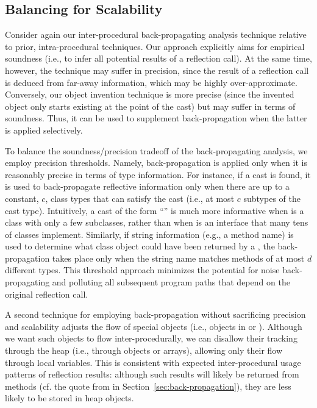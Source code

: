 \subsection{Balancing for Scalability}
\label{sec:throttling}

Consider again our inter-procedural back-propagating analysis
technique relative to prior, intra-procedural techniques. Our approach
explicitly aims for empirical soundness (i.e., to infer all potential
results of a reflection call). At the same time, however, the
technique may suffer in precision, since the result of a reflection
call is deduced from far-away information, which may be highly
over-approximate. Conversely, our object invention technique is more
precise (since the invented object only starts existing at the point
of the cast) but may suffer in terms of soundness. Thus, it can be
used to supplement back-propagation when the latter is applied
selectively.

To balance the soundness/precision tradeoff of the back-propagating
analysis, we employ precision thresholds. Namely, back-propagation is
applied only when it is reasonably precise in terms of type
information. For instance, if a cast is found, it is used to
back-propagate reflective information only when there are up to a
constant, $c$, class types that can satisfy the cast (i.e., at most
$c$ subtypes of the cast type). Intuitively, a cast of the form
``'' is much more informative when  is a
class with only a few subclasses, rather than when  is an
interface that many tens of classes implement. Similarly, if string
information (e.g., a method name) is used to determine what class
object could have been returned by a ,
the back-propagation takes place only when the string name matches
methods of at most $d$ different types. This threshold approach
minimizes the potential for noise back-propagating and polluting all
subsequent program paths that depend on the original reflection call.

A second technique for employing back-propagation without sacrificing
precision and scalability adjusts the flow of special objects (i.e.,
objects in  or
). Although we want such objects
to flow inter-procedurally, we can disallow their tracking through the
heap (i.e., through objects or arrays), allowing only their flow
through local variables. This is consistent with expected
inter-procedural usage patterns of reflection results: although such
results will likely be returned from methods (cf. the quote from
\cite{aplas/LivshitsWL05} in Section~\ref{sec:back-propagation}),
they are less likely to be stored in heap objects. 

